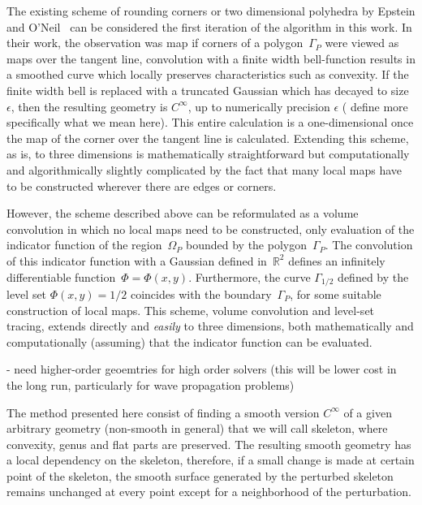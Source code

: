 \documentclass[11pt]{article}
\newcommand\bbR{\mathbb R}
\begin{document}
The existing scheme of rounding corners or two dimensional polyhedra
by Epstein and O'Neil~\cite{epsteinXXXX} can be considered the first
iteration of the algorithm in this work. In their work, the
observation was map if corners of a polygon~$\Gamma_P$ were viewed as
maps over the tangent line, convolution with a finite width
bell-function results in a smoothed curve which locally preserves
characteristics such as convexity. If the finite width bell is
replaced with a truncated Gaussian which has decayed to
size~$\epsilon$, then the resulting geometry is $C^\infty$, up to
numerically precision $\epsilon$ ({\color{red} define more specifically what we
mean here}). This entire calculation is a one-dimensional once the map
of the corner over the tangent line is calculated. Extending this
scheme, as is, to three dimensions is mathematically straightforward
but computationally and algorithmically slightly complicated by the
fact that many local maps have to be constructed wherever there are
edges or corners.

However, the scheme described above can be reformulated as a volume
convolution in which no local maps need to be constructed, only
evaluation of the indicator function of the region~$\Omega_P$ bounded
by the polygon~$\Gamma_P$. The convolution of this indicator function
with a Gaussian defined in~$\bbR^2$ defines an infinitely
differentiable function~$\Phi = \Phi(x,y)$. Furthermore, the curve
$\Gamma_{1/2}$ defined by the level set $\Phi(x,y) = 1/2$ coincides
with the boundary~$\Gamma_P$, for some suitable construction of local
maps. This scheme, volume convolution and level-set tracing, extends
directly and \emph{easily} to three dimensions, both mathematically
and computationally (assuming) that the indicator function can be
evaluated.




- need higher-order geoemtries for high order solvers (this will be
lower cost in the long run, particularly for wave propagation
problems)


The method presented here consist of finding a smooth version
$C^{\infty}$ of a given arbitrary geometry (non-smooth in general)
that we will call skeleton, where convexity, genus and flat parts are
preserved. The resulting smooth geometry has a local dependency on the
skeleton, therefore, if a small change is made at certain point of the
skeleton, the smooth surface generated by the perturbed skeleton
remains unchanged at every point except for a neighborhood of the
perturbation.
\end{document}
